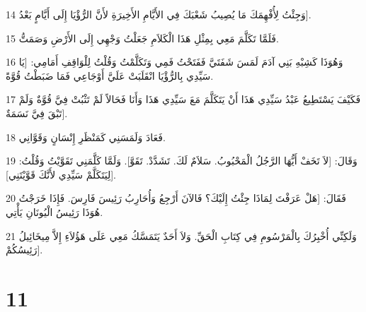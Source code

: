 \par 14 وَجِئْتُ لِأُفْهِمَكَ مَا يُصِيبُ شَعْبَكَ فِي الأَيَّامِ الأَخِيرَةِ لأَنَّ الرُّؤْيَا إِلَى أَيَّامٍ بَعْدُ].
\par 15 فَلَمَّا تَكَلَّمَ مَعِي بِمِثْلِ هَذَا الْكَلاَمِ جَعَلْتُ وَجْهِي إِلَى الأَرْضِ وَصَمَتُّ.
\par 16 وَهُوَذَا كَشِبْهِ بَنِي آدَمَ لَمَسَ شَفَتَيَّ فَفَتَحْتُ فَمِي وَتَكَلَّمْتُ وَقُلْتُ لِلْوَاقِفِ أَمَامِي: [يَا سَيِّدِي بِالرُّؤْيَا انْقَلَبَتْ عَلَيَّ أَوْجَاعِي فَمَا ضَبَطْتُ قُوَّةً.
\par 17 فَكَيْفَ يَسْتَطِيعُ عَبْدُ سَيِّدِي هَذَا أَنْ يَتَكَلَّمَ مَعَ سَيِّدِي هَذَا وَأَنَا فَحَالاً لَمْ تَثْبُتْ فِيَّ قُوَّةٌ وَلَمْ تَبْقَ فِيَّ نَسَمَةٌ].
\par 18 فَعَادَ وَلَمَسَنِي كَمَنْظَرِ إِنْسَانٍ وَقَوَّانِي.
\par 19 وَقَالَ: [لاَ تَخَفْ أَيُّهَا الرَّجُلُ الْمَحْبُوبُ. سَلاَمٌ لَكَ. تَشَدَّدْ. تَقَوَّ]. وَلَمَّا كَلَّمَنِي تَقَوَّيْتُ وَقُلْتُ: [لِيَتَكَلَّمْ سَيِّدِي لأَنَّكَ قَوَّيْتَنِي].
\par 20 فَقَالَ: [هَلْ عَرَفْتَ لِمَاذَا جِئْتُ إِلَيْكَ؟ فَالآنَ أَرْجِعُ وَأُحَارِبُ رَئِيسَ فَارِسَ. فَإِذَا خَرَجْتُ هُوَذَا رَئِيسُ الْيُونَانِ يَأْتِي.
\par 21 وَلَكِنِّي أُخْبِرُكَ بِالْمَرْسُومِ فِي كِتَابِ الْحَقِّ. وَلاَ أَحَدٌ يَتَمَسَّكُ مَعِي عَلَى هَؤُلاَءِ إِلاَّ مِيخَائِيلُ رَئِيسُكُمْ].

\chapter{11}

